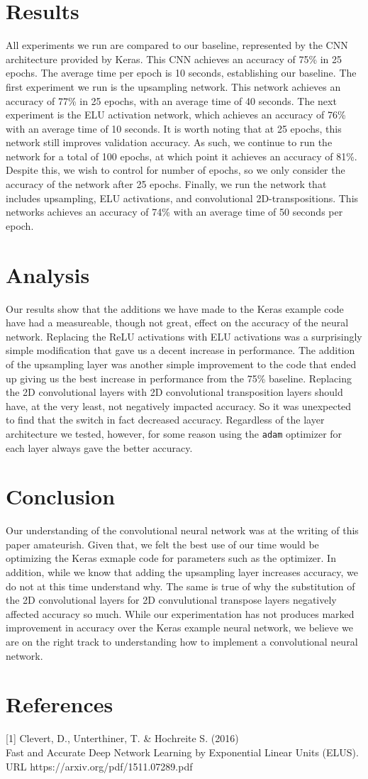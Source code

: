 \documentclass{article}
\begin{document}
\section{Results}
All experiments we run are compared to our baseline, represented by the CNN architecture provided by Keras. This CNN achieves an accuracy of 75\% in 25 epochs. The average time per epoch is 10 seconds, establishing our baseline. The first experiment we run is the upsampling network. This network achieves an accuracy of 77\% in 25 epochs, with an average time of 40 seconds. The next experiment is the ELU activation network, which achieves an accuracy of 76\% with an average time of 10 seconds. It is worth noting that at 25 epochs, this network still improves validation accuracy. As such, we continue to run the network for a total of 100 epochs, at which point it achieves an accuracy of 81\%. Despite this, we wish to control for number of epochs, so we only consider the accuracy of the network after 25 epochs. Finally, we run the network that includes upsampling, ELU activations, and convolutional 2D-transpositions. This networks achieves an accuracy of 74\% with an average time of 50 seconds per epoch.

\section{Analysis}
Our results show that the additions we have made to the Keras example code have had a measureable, though not great, effect on the accuracy of the neural network. Replacing the ReLU activations with ELU activations was a surprisingly simple modification that gave us a decent increase in performance. The addition of the upsampling layer was another simple improvement to the code that ended up giving us the best increase in performance from the 75\% baseline. Replacing the 2D convolutional layers with 2D convolutional transposition layers should have, at the very least, not negatively impacted accuracy. So it was unexpected to find that the switch in fact decreased accuracy. Regardless of the layer architecture we tested, however, for some reason using the \texttt{adam} optimizer for each layer always gave the better accuracy.

\section{Conclusion}
Our understanding of the convolutional neural network was at the writing of this paper amateurish. Given that, we felt the best use of our time would be optimizing the Keras exmaple code for parameters such as the optimizer. In addition, while we know that adding the upsampling layer increases accuracy, we do not at this time understand why. The same is true of why the substitution of the 2D convolutional layers for 2D convulutional transpose layers negatively affected accuracy so much. While our experimentation has not produces marked improvement in accuracy over the Keras example neural network, we believe we are on the right track to understanding how to implement a convolutional neural network.

\section{References}
\small
[1] Clevert, D., Unterthiner, T. \& Hochreite S. (2016) \\
Fast and Accurate Deep Network Learning by Exponential Linear Units (ELUS). URL https://arxiv.org/pdf/1511.07289.pdf
\end{document}
